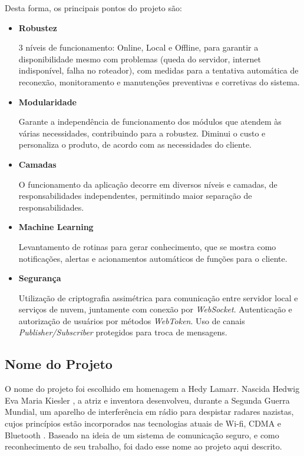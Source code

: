 Desta forma, os principais pontos do projeto são:

\begin{itemize}
\item \textbf{Robustez}

3 níveis de funcionamento: Online, Local e Offline, para garantir a disponibilidade mesmo com problemas (queda do servidor, internet indisponível, falha no roteador), com medidas para a tentativa automática de reconexão, monitoramento e manutenções preventivas e corretivas do sistema.

\item \textbf{Modularidade}

Garante a independência de funcionamento dos módulos que atendem às várias necessidades, contribuindo para a robustez. Diminui o custo e personaliza o produto, de acordo com as necessidades do cliente.

\item \textbf{Camadas}

O funcionamento da aplicação decorre em diversos níveis e camadas, de responsabilidades independentes, permitindo maior separação de responsabilidades.

\item \textbf{Machine Learning}

Levantamento de rotinas para gerar conhecimento, que se mostra como notificações, alertas e acionamentos automáticos de funções para o cliente.

\item \textbf{Segurança}

Utilização de criptografia assimétrica para comunicação entre servidor local e serviços de nuvem, juntamente com conexão por \textit{WebSocket}. Autenticação e autorização de usuários por métodos \textit{WebToken}. Uso de canais \textit{Publisher/Subscriber} protegidos para troca de mensagens.

\end{itemize}

\subsection{Nome do Projeto}
O nome do projeto foi escolhido em homenagem a Hedy Lamarr. Nascida Hedwig Eva Maria Kiesler \cite{shearer}, a atriz e inventora desenvolveu, durante a Segunda Guerra Mundial, um aparelho de interferência em rádio para despistar radares nazistas, cujos princípios estão incorporados nas tecnologias atuais de Wi-fi, CDMA e Bluetooth \cite{electronicFrontier}. Baseado na ideia de um sistema de comunicação seguro, e como reconhecimento de seu trabalho, foi dado esse nome ao projeto aqui descrito.

